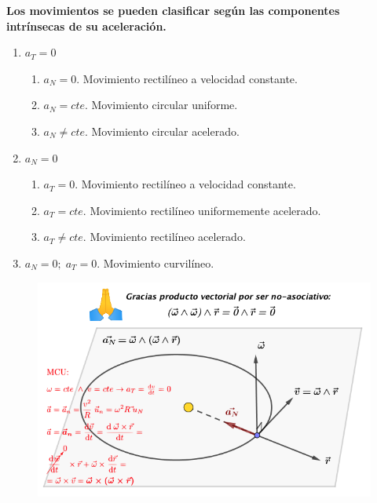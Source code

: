 \textbf{Los movimientos se pueden clasificar según las componentes intrínsecas de su aceleración. }
\vspace{-2mm}\begin{enumerate}
\vspace{-2mm}\item $a_T=0$ 
	\vspace{-2mm}\begin{enumerate}
	\vspace{-2mm}\item $a_N=0$. Movimiento rectilíneo a velocidad constante. 
	\vspace{-2mm}\item $a_N=cte$. Movimiento circular uniforme. 
	\vspace{-2mm}\item $a_N\neq cte$. Movimiento circular acelerado. 
	\vspace{-2mm}\end{enumerate}
\vspace{-2mm}\item $a_N=0$ 
	\vspace{-2mm}\begin{enumerate}
	\vspace{-2mm}\item $a_T=0$.   Movimiento rectilíneo a velocidad constante. 
	\vspace{-2mm}\item $a_T=cte$. Movimiento rectilíneo uniformemente acelerado. 
	\vspace{-2mm}\item $a_T\neq cte$. Movimiento rectilíneo acelerado. 
	\end{enumerate}
\vspace{-2mm}\item  $a_N=0;\; a_T=0$.  Movimiento curvilíneo.
\end{enumerate}

\vspace{10mm} %
\begin{figure}[H]
		\centering
		\includegraphics[width=.9\textwidth]{imagenes/imagenes02/T02IM34.png}
		\end{figure}

